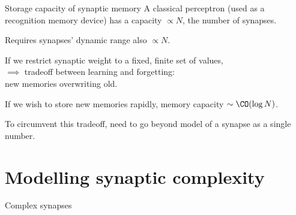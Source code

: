 \documentclass{beamer}%
\begin{document}

\begin{frame}{Storage capacity of synaptic memory}
%
  A classical perceptron (used as a recognition memory device) has a capacity $\propto N$, the number of synapses.

 \vp Requires synapses' dynamic range also $\propto N$.

 \vp If we restrict synaptic weight to a fixed, finite set of values,\\
 \hp $\implies$ tradeoff between learning and forgetting:\\
 \hp new memories overwriting old.

 \vp If we wish to store new memories rapidly, memory capacity  $\sim\CO(\log N)$.
 \\ 

 \vp To circumvent this tradeoff, need to go beyond model of a synapse as a single number.
%
\end{frame}


\section{Modelling synaptic complexity}


\begin{frame}{Complex synapses}
%
  \hp
  \hp{}
  \hp{}
%
\end{frame}

\end{document}
